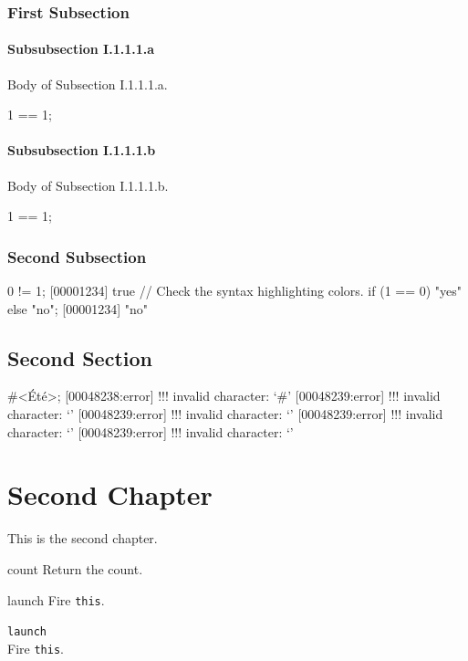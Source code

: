 \documentclass[openright,twoside,11pt]{book}
\begin{document}
\subsection{First Subsection}
\subsubsection{Subsubsection I.1.1.1.a}
Body of Subsection I.1.1.1.a.

\begin{urbiassert}[firstnumber=1]
1 == 1;
\end{urbiassert}

\subsubsection{Subsubsection I.1.1.1.b}
Body of Subsection I.1.1.1.b.

\begin{urbiassert}[firstnumber=1]
1 == 1;
\end{urbiassert}

\subsection{Second Subsection}
\begin{urbiscript}
0 != 1;
[00001234] true
// Check the syntax highlighting colors.
if (1 == 0) "yes" else "no";
[00001234] "no"
\end{urbiscript}

\section{Second Section}
\begin{urbiunchecked}[escapeinside=<>]
#<Été>;
[00048238:error] !!! invalid character: `#'
[00048239:error] !!! invalid character: `'
[00048239:error] !!! invalid character: `'
[00048239:error] !!! invalid character: `'
[00048239:error] !!! invalid character: `'
\end{urbiunchecked}

\chapter{Second Chapter}

This is the second chapter.



\begin{urbiscriptapi}
\item[count] Return the count.
\item[launch]
  Fire \lstinline|this|.
\item \lstinline|launch|~\\
  Fire \lstinline|this|.

\end{urbiscriptapi}
\end{document}
